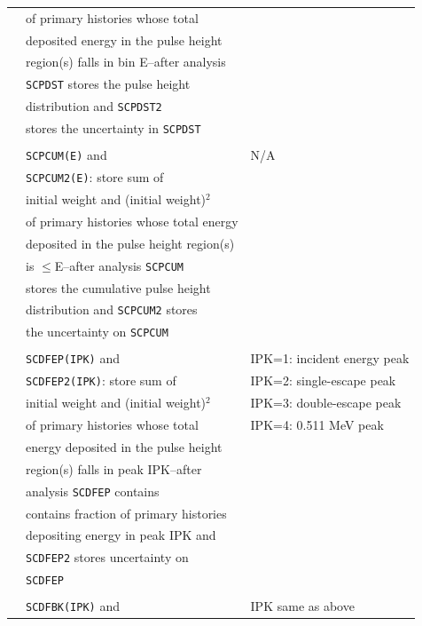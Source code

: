 \documentclass[12pt,twoside]{article}  %
\begin{document}
\begin{longtable}{lll}
          & of primary histories whose total&\\
          & deposited energy in the pulse height&\\
          & region(s) falls in bin E--after analysis&\\
          & {\tt SCPDST} stores the pulse height&\\
          & distribution and {\tt SCPDST2} &\\
          & stores the uncertainty in {\tt SCPDST}&\\
          &&\\
          & {\tt SCPCUM(E)} and & N/A\\
          & {\tt SCPCUM2(E)}: store sum of&\\
          & initial weight and (initial weight)$^2$ &\\
          & of primary histories whose total energy&\\
          & deposited in the pulse height region(s)&\\
          & is $\leq$E--after analysis {\tt SCPCUM}&\\
          & stores the cumulative pulse height&\\
          & distribution and {\tt SCPCUM2} stores&\\
          & the uncertainty on {\tt SCPCUM}&\\
          &&\\
          & {\tt SCDFEP(IPK)} and & IPK=1: incident energy peak\\
          & {\tt SCDFEP2(IPK)}: store sum of& IPK=2: single-escape peak\\
          & initial weight and (initial weight)$^2$ & IPK=3: double-escape peak\\
          & of primary histories whose total & IPK=4: 0.511 MeV peak\\
          & energy deposited in the pulse height&\\
          & region(s) falls in peak IPK--after &\\
          & analysis {\tt SCDFEP} contains &\\
          & contains fraction of primary histories&\\
          & depositing energy in peak IPK and &\\
          & {\tt SCDFEP2} stores uncertainty on&\\
          & {\tt SCDFEP}&\\  
          &&\\
          & {\tt SCDFBK(IPK)} and & IPK same as above\\

\end{longtable}
\end{document}
